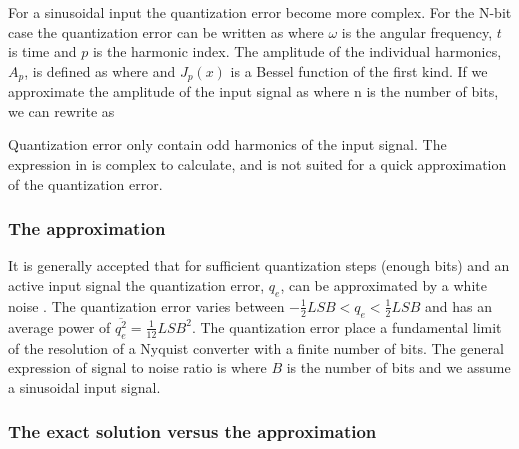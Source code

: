 For a sinusoidal input the quantization error become more complex.
For the N-bit case the quantization error can be written as \cite{blachman85}
where $\omega$ is the angular frequency,
$t$ is time and $p$ is the harmonic index. The amplitude of the
individual harmonics, $A_p$, is defined as 
where
and $J_p(x)$ is a Bessel function of the first kind. 
If we approximate the amplitude of the input signal as
where n is the number of bits, we can rewrite  as 

Quantization error only contain odd harmonics of the input signal. The
expression in  is complex to calculate, and is not suited
for a quick approximation of the quantization error.

\subsubsection{The approximation}
It is generally accepted that for sufficient quantization steps
(enough bits) and an active input signal the quantization error, $q_e$,
can be approximated by a white noise \cite{widrow56}.
The quantization error varies between $-\frac{1}{2}LSB < q_e <
\frac{1}{2}LSB$ and has an average power of $\overline{q_e^2} =
\frac{1}{12}LSB^2$. The quantization error place a
fundamental limit of the resolution of a Nyquist converter with a
finite number of bits. The general expression of signal to noise ratio is
where $B$ is the number of bits and we assume a sinusoidal input signal.

\subsubsection{The exact solution versus the approximation}

